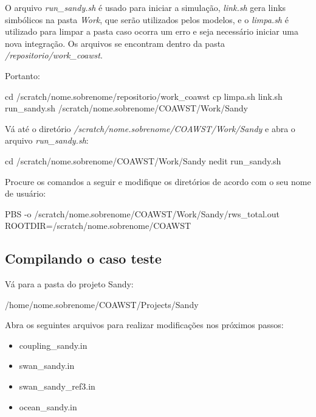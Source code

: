 \noindent O arquivo \textit{run\_sandy.sh} é usado para iniciar a simulação, \textit{link.sh} gera links simbólicos na pasta \textit{Work}, que serão utilizados pelos modelos, e o \textit{limpa.sh} é utilizado para limpar a pasta caso ocorra um erro e seja necessário iniciar uma nova integração. Os arquivos se encontram dentro da pasta \textit{/repositorio/work\_coawst}.
\bigskip

\noindent Portanto:

\bigskip

\begin{bashcode}
cd /scratch/nome.sobrenome/repositorio/work_coawst
cp limpa.sh link.sh run_sandy.sh /scratch/nome.sobrenome/COAWST/Work/Sandy
\end{bashcode}
\bigskip

\noindent Vá até o diretório \textit{/scratch/nome.sobrenome/COAWST/Work/Sandy} e abra o arquivo \textit{run\_sandy.sh}:
\bigskip

\begin{bashcode}
cd /scratch/nome.sobrenome/COAWST/Work/Sandy
nedit run_sandy.sh
\end{bashcode}
\bigskip

\noindent Procure os comandos a seguir e modifique os diretórios de acordo com o seu nome de usuário:
\bigskip

\begin{bashcode}
PBS -o /scratch/nome.sobrenome/COAWST/Work/Sandy/rws_total.out
ROOTDIR=/scratch/nome.sobrenome/COAWST
\end{bashcode}
\bigskip


\subsection{Compilando o caso teste}
\bigskip

\noindent Vá para a pasta do projeto Sandy:
\bigskip

\begin{bashcode}
/home/nome.sobrenome/COAWST/Projects/Sandy
\end{bashcode}
\bigskip

\noindent Abra os seguintes arquivos para realizar modificações nos próximos passos:
\bigskip

\begin{itemize}
\item coupling\_sandy.in
\item swan\_sandy.in
\item swan\_sandy\_ref3.in
\item ocean\_sandy.in
\end{itemize}
\bigskip

